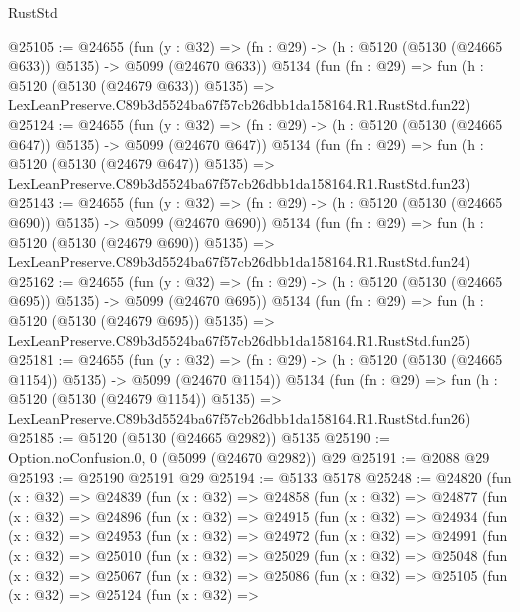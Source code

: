 \begin{lexlean}{RustStd}
\begin{coremodule}
@25105 := @24655
    (fun (y : @32) => (fn : @29) -> (h : @5120 (@5130 (@24665 @633)) @5135) -> @5099 (@24670 @633))
    @5134
    (fun (fn : @29) =>
    fun (h : @5120 (@5130 (@24679 @633)) @5135) =>
    LexLeanPreserve.C89b3d5524ba67f57cb26dbb1da158164.R1.RustStd.fun22)
@25124 := @24655
    (fun (y : @32) => (fn : @29) -> (h : @5120 (@5130 (@24665 @647)) @5135) -> @5099 (@24670 @647))
    @5134
    (fun (fn : @29) =>
    fun (h : @5120 (@5130 (@24679 @647)) @5135) =>
    LexLeanPreserve.C89b3d5524ba67f57cb26dbb1da158164.R1.RustStd.fun23)
@25143 := @24655
    (fun (y : @32) => (fn : @29) -> (h : @5120 (@5130 (@24665 @690)) @5135) -> @5099 (@24670 @690))
    @5134
    (fun (fn : @29) =>
    fun (h : @5120 (@5130 (@24679 @690)) @5135) =>
    LexLeanPreserve.C89b3d5524ba67f57cb26dbb1da158164.R1.RustStd.fun24)
@25162 := @24655
    (fun (y : @32) => (fn : @29) -> (h : @5120 (@5130 (@24665 @695)) @5135) -> @5099 (@24670 @695))
    @5134
    (fun (fn : @29) =>
    fun (h : @5120 (@5130 (@24679 @695)) @5135) =>
    LexLeanPreserve.C89b3d5524ba67f57cb26dbb1da158164.R1.RustStd.fun25)
@25181 := @24655
    (fun (y : @32) =>
    (fn : @29) -> (h : @5120 (@5130 (@24665 @1154)) @5135) -> @5099 (@24670 @1154))
    @5134
    (fun (fn : @29) =>
    fun (h : @5120 (@5130 (@24679 @1154)) @5135) =>
    LexLeanPreserve.C89b3d5524ba67f57cb26dbb1da158164.R1.RustStd.fun26)
@25185 := @5120 (@5130 (@24665 @2982)) @5135
@25190 := Option.noConfusion.{0, 0} (@5099 (@24670 @2982)) @29
@25191 := @2088 @29
@25193 := @25190 @25191 @29
@25194 := @5133 @5178
@25248 := @24820
    (fun (x : @32) =>
    @24839
      (fun (x : @32) =>
      @24858
        (fun (x : @32) =>
        @24877
          (fun (x : @32) =>
          @24896
            (fun (x : @32) =>
            @24915
              (fun (x : @32) =>
              @24934
                (fun (x : @32) =>
                @24953
                  (fun (x : @32) =>
                  @24972
                    (fun (x : @32) =>
                    @24991
                      (fun (x : @32) =>
                      @25010
                        (fun (x : @32) =>
                        @25029
                          (fun (x : @32) =>
                          @25048
                            (fun (x : @32) =>
                            @25067
                              (fun (x : @32) =>
                              @25086
                                (fun (x : @32) =>
                                @25105
                                  (fun (x : @32) =>
                                  @25124
                                    (fun (x : @32) =>

\end{coremodule}
\end{lexlean}

